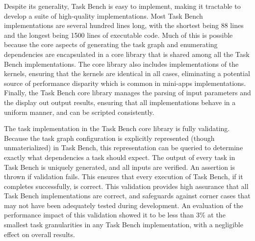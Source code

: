 Despite its generality, Task Bench is easy to implement, making it
tractable to develop a suite of high-quality implementations. Most
Task Bench implementations are several hundred lines long, with the
shortest being 88 lines and the longest being 1500 lines of executable
code. Much of this is possible because the core aspects of generating
the task graph and enumerating dependencies are encapsulated in a core
library that is shared among all the Task Bench implementations. The
core library also includes implementations of the kernels, ensuring
that the kernels are identical in all cases, eliminating a potential
source of performance disparity which is common in mini-apps
implementations. Finally, the Task Bench core library manages the
parsing of input parameters and the display out output results,
ensuring that all implementations behave in a uniform manner, and can
be scripted consistently.

The task implementation in the Task Bench core library is fully
validating. Because the task graph configuration is explicitly
represented (though unmaterialized) in Task Bench, this representation
can be queried to determine exactly what dependencies a task should
expect. The output of every task in Task Bench is uniquely generated,
and all inputs are verified. An assertion is thrown if validation
fails. This ensures that every execution of Task Bench, if it
completes successfully, is correct. This validation provides high
assurance that all Task Bench implementations are correct, and
safeguards against corner cases that may not have been adequately
tested during development. An evaluation of the performance impact of
this validation showed it to be less than 3\% at the smallest task
granularities in any Task Bench implementation, with a negligible
effect on overall results.
